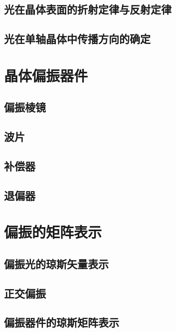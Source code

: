 \documentclass[cn,10pt,chinesefont=founder,math=mtpro2,cite=super,toc=onecol,twoside,openany]{elegantbook}
\begin{document}
\subsection{光在晶体表面的折射定律与反射定律}

\subsection{光在单轴晶体中传播方向的确定}

\section{晶体偏振器件}

\subsection{偏振棱镜}

\subsection{波片}

\subsection{补偿器}

\subsection{退偏器}

\section{偏振的矩阵表示}

\subsection{偏振光的琼斯矢量表示}

\subsection{正交偏振}

\subsection{偏振器件的琼斯矩阵表示}
\end{document}
